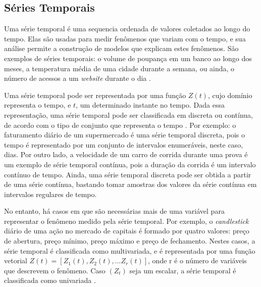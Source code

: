\subsection{Séries Temporais}
	\label{subsec:series_temporais}

Uma série temporal é uma sequencia ordenada de valores coletados ao longo do
tempo. Elas são usadas para medir fenômenos que variam com o tempo, e sua
análise permite a construção de modelos que explicam estes fenômenos. São
exemplos de séries temporais: o volume de poupança em um banco ao longo dos
meses, a temperatura média de uma cidade durante a semana, ou ainda, o número de
acessos a um \textit{website} durante o dia \cite{morettin2006analise}.

Uma série temporal pode ser representada por uma função $Z(t)$, cujo domínio
representa o tempo, e $t$, um determinado instante no tempo. Dada essa
representação, uma série temporal pode ser classificada em discreta ou contínua,
de acordo com o tipo de conjunto que representa o tempo
\cite{morettin2006analise}. Por exemplo: o faturamento diário de um supermercado
é uma série temporal discreta, pois o tempo é representado por um conjunto de
intervalos enumeráveis, neste caso, dias. Por outro lado, a velocidade de um
carro de corrida durante uma prova é um exemplo de série temporal contínua, pois
a duração da corrida é um intervalo contínuo de tempo. Ainda, uma série temporal
discreta pode ser obtida a partir de uma série contínua, bastando tomar amostras
dos valores da série contínua em intervalos regulares de tempo.

No entanto, há casos em que são necessárias mais de uma variável para
representar o fenômeno medido pela série temporal. Por exemplo, o
\emph{candlestick} diário de uma ação no mercado de capitais é formado por
quatro valores: preço de abertura, preço mínimo, preço máximo e preço de
fechamento. Nestes casos, a série temporal é classificada como multivariada, e é
representada por uma função vetorial
$Z\left(t\right) =
	\left[
		Z_1\left(t\right),
		Z_2\left(t\right),
		...
		Z_r\left(t\right)
	\right]$,
onde r é o número de variáveis que descrevem o fenômeno. Caso $\left(Z_t\right)$
seja um escalar, a série temporal é classificada como univariada
\cite{morettin2006analise}.